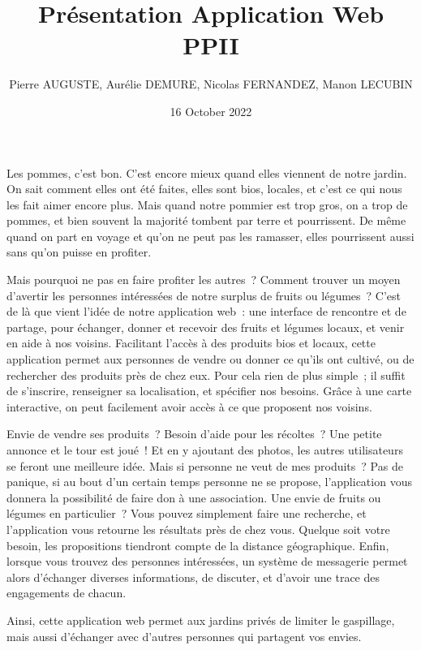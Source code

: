 \documentclass{article}
\title{Présentation Application Web PPII}
\author{Pierre AUGUSTE, Aurélie DEMURE, Nicolas FERNANDEZ, Manon LECUBIN}
\date{16 October 2022}
\begin{document}
\maketitle

	Les pommes, c'est bon. C'est encore mieux quand elles viennent de notre jardin. On sait comment elles ont été faites, elles sont bios, locales, et c'est ce qui nous les fait aimer encore plus. Mais quand notre pommier est trop gros, on a trop de pommes, et bien souvent la majorité tombent par terre et pourrissent. De même quand on part en voyage et qu'on ne peut pas les ramasser, elles pourrissent aussi sans qu'on puisse en profiter.

	Mais pourquoi ne pas en faire profiter les autres ? Comment trouver un moyen d'avertir les personnes intéressées de notre surplus de fruits ou légumes ? C'est de là que vient l'idée de notre application web : une interface de rencontre et de partage, pour échanger, donner et recevoir des fruits et légumes locaux, et venir en aide à nos voisins.
	Facilitant l'accès à des produits bios et locaux, cette application permet aux personnes de vendre ou donner ce qu'ils ont cultivé, ou de rechercher des produits près de chez eux. Pour cela rien de plus simple ; il suffit de s'inscrire, renseigner sa localisation, et spécifier nos besoins. Grâce à une carte interactive, on peut facilement avoir accès à ce que proposent nos voisins.

	Envie de vendre ses produits ? Besoin d'aide pour les récoltes ? Une petite annonce et le tour est joué ! Et en y ajoutant des photos, les autres utilisateurs se feront une meilleure idée. Mais si personne ne veut de mes produits ? Pas de panique, si au bout d'un certain temps personne ne se propose, l'application vous donnera la possibilité de faire don à une association.
	Une envie de fruits ou légumes en particulier ? Vous pouvez simplement faire une recherche, et l'application vous retourne les résultats près de chez vous. Quelque soit votre besoin, les propositions tiendront compte de la distance géographique.
	Enfin, lorsque vous trouvez des personnes intéressées, un système de messagerie permet alors d'échanger diverses informations, de discuter, et d'avoir une trace des engagements de chacun.

	Ainsi, cette application web permet aux jardins privés de limiter le gaspillage, mais aussi d'échanger avec d'autres personnes qui partagent vos envies.
\end{document}
